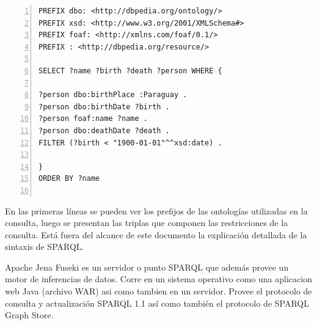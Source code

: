 \begin{lstlisting}[captionpos=b, caption=Ejemplo de consulta SPARQL, label=lst:consulta-sparql,  numbers=left,  numberstyle=\tiny\color{mygray},
    basicstyle=\tiny,frame=single]
PREFIX dbo: <http://dbpedia.org/ontology/>
PREFIX xsd: <http://www.w3.org/2001/XMLSchema#>
PREFIX foaf: <http://xmlns.com/foaf/0.1/>
PREFIX : <http://dbpedia.org/resource/>

SELECT ?name ?birth ?death ?person WHERE { 

?person dbo:birthPlace :Paraguay . 
?person dbo:birthDate ?birth . 
?person foaf:name ?name . 
?person dbo:deathDate ?death . 
FILTER (?birth < "1900-01-01"^^xsd:date) . 

}
ORDER BY ?name
 
\end{lstlisting}

En las primeras líneas se pueden ver los prefijos de las ontologías utilizadas en la consulta, luego se presentan las triplas que componen las restricciones de la consulta. Está fuera del alcance de este documento la explicación detallada de la sintaxis de SPARQL.

Apache Jena Fuseki es un servidor o punto SPARQL que además provee un motor de inferencias de datos. Corre en un sistema operativo como una aplicacion web Java (archivo WAR) asi como tambien en un servidor. Provee el protocolo de consulta y actualización SPARQL 1.1 así como también el protocolo de SPARQL Graph Store.
